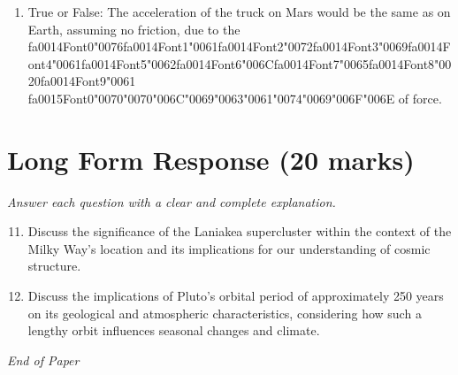 \documentclass[12pt]{article}
\begin{document}
\begin{enumerate}[label=\arabic*.]
\item True or False: The acceleration of the truck on Mars would be the same as on Earth, assuming no friction, due to the {\csname fa0014Font0\endcsname\char"0076}{\csname fa0014Font1\endcsname\char"0061}{\csname fa0014Font2\endcsname\char"0072}{\csname fa0014Font3\endcsname\char"0069}{\csname fa0014Font4\endcsname\char"0061}{\csname fa0014Font5\endcsname\char"0062}{\csname fa0014Font6\endcsname\char"006C}{\csname fa0014Font7\endcsname\char"0065}{\csname fa0014Font8\endcsname\char"0020}{\csname fa0014Font9\endcsname\char"0061} {\csname fa0015Font0\endcsname\char"0070}{\char"0070}{\char"006C}{\char"0069}{\char"0063}{\char"0061}{\char"0074}{\char"0069}{\char"006F}{\char"006E} of force.
\end{enumerate}

\section*{Long Form Response (20 marks)}
\textit{Answer each question with a clear and complete explanation.}
\begin{enumerate}[label=\arabic*.]
\setcounter{enumi}{10}
\item Discuss the significance of the Laniakea supercluster within the context of the Milky
Way's location and its implications for our understanding of cosmic structure.
\item Discuss the implications of Pluto's orbital period of approximately 250 years on its
geological and atmospheric characteristics, considering how such a lengthy orbit
influences seasonal changes and climate.
\end{enumerate}

\vfill
\noindent\textit{End of Paper}
\end{document}

